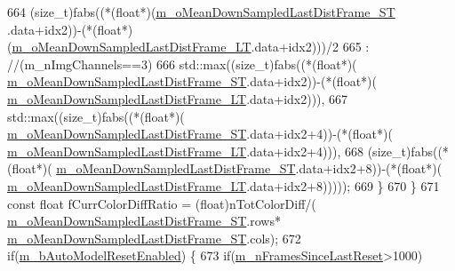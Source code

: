 \begin{DoxyCode}
664                     (\textcolor{keywordtype}{size\_t})fabs((*(\textcolor{keywordtype}{float}*)(\mbox{\hyperlink{class_background_subtractor_su_b_s_e_n_s_e_a92a9aec9a8b34383b67d97467bd34515}{m\_oMeanDownSampledLastDistFrame\_ST}}
      .data+idx2))-(*(\textcolor{keywordtype}{float}*)(\mbox{\hyperlink{class_background_subtractor_su_b_s_e_n_s_e_ab6056c53d3237ae04da509b36ec40486}{m\_oMeanDownSampledLastDistFrame\_LT}}.data+idx2)))/2
665                             :  \textcolor{comment}{//(m\_nImgChannels==3)}
666                         std::max((\textcolor{keywordtype}{size\_t})fabs((*(\textcolor{keywordtype}{float}*)(
      \mbox{\hyperlink{class_background_subtractor_su_b_s_e_n_s_e_a92a9aec9a8b34383b67d97467bd34515}{m\_oMeanDownSampledLastDistFrame\_ST}}.data+idx2))-(*(\textcolor{keywordtype}{float}*)(
      \mbox{\hyperlink{class_background_subtractor_su_b_s_e_n_s_e_ab6056c53d3237ae04da509b36ec40486}{m\_oMeanDownSampledLastDistFrame\_LT}}.data+idx2))),
667                             std::max((\textcolor{keywordtype}{size\_t})fabs((*(\textcolor{keywordtype}{float}*)(
      \mbox{\hyperlink{class_background_subtractor_su_b_s_e_n_s_e_a92a9aec9a8b34383b67d97467bd34515}{m\_oMeanDownSampledLastDistFrame\_ST}}.data+idx2+4))-(*(\textcolor{keywordtype}{float}*)(
      \mbox{\hyperlink{class_background_subtractor_su_b_s_e_n_s_e_ab6056c53d3237ae04da509b36ec40486}{m\_oMeanDownSampledLastDistFrame\_LT}}.data+idx2+4))),
668                                         (\textcolor{keywordtype}{size\_t})fabs((*(\textcolor{keywordtype}{float}*)(
      \mbox{\hyperlink{class_background_subtractor_su_b_s_e_n_s_e_a92a9aec9a8b34383b67d97467bd34515}{m\_oMeanDownSampledLastDistFrame\_ST}}.data+idx2+8))-(*(\textcolor{keywordtype}{float}*)(
      \mbox{\hyperlink{class_background_subtractor_su_b_s_e_n_s_e_ab6056c53d3237ae04da509b36ec40486}{m\_oMeanDownSampledLastDistFrame\_LT}}.data+idx2+8)))));
669             \}
670         \}
671         \textcolor{keyword}{const} \textcolor{keywordtype}{float} fCurrColorDiffRatio = (float)nTotColorDiff/(
      \mbox{\hyperlink{class_background_subtractor_su_b_s_e_n_s_e_a92a9aec9a8b34383b67d97467bd34515}{m\_oMeanDownSampledLastDistFrame\_ST}}.rows*
      \mbox{\hyperlink{class_background_subtractor_su_b_s_e_n_s_e_a92a9aec9a8b34383b67d97467bd34515}{m\_oMeanDownSampledLastDistFrame\_ST}}.cols);
672         \textcolor{keywordflow}{if}(\mbox{\hyperlink{class_background_subtractor_l_b_s_p_a9d260f4e42e3fc79fb21af950ca9087a}{m\_bAutoModelResetEnabled}}) \{
673             \textcolor{keywordflow}{if}(\mbox{\hyperlink{class_background_subtractor_l_b_s_p_ab56bf775dfdf0579e834e45210c3a92a}{m\_nFramesSinceLastReset}}>1000)

\end{DoxyCode}
